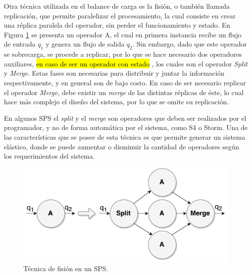 
Otra técnica utilizada en el balance de carga es la fisión, o también llamada replicación, que permite paralelizar el procesamiento, la cual consiste en crear una réplica paralela del operador, sin perder el funcionamiento y estado. En Figura \ref{fig:fision} se presenta un operador A, el cual en primera instancia recibe un flujo de entrada $q_1$ y genera un flujo de salida $q_2$. Sin embargo, dado que este operador se sobrecarga, se procede a replicar, por lo que se hace necesario dos operadores auxiliares, \hl{en caso de ser un operador con estado} \citep{WuKWO12}, los cuales son el operador \textit{Split} y \textit{Merge}. Estas fases son necesarias para distribuir y juntar la información respectivamente, y en general son de bajo costo. En caso de ser necesario replicar el operador \textit{Merge}, debe existir un \textit{merge} de las distintas réplicas de éste, lo cual hace más complejo el diseño del sistema, por lo que se omite su replicación.

En algunos SPS el \textit{split} y el \textit{merge} son operadores que deben ser realizados por el programador, y no de forma automática por el sistema, como S4 o Storm. Una de las características que se posee de esta técnica es que permite generar un sistema elástico, donde se puede aumentar o disminuir la cantidad de operadores según los requerimientos del sistema.

\begin{figure}[!ht]
	\centering
	\includegraphics[scale=0.4]{images/Fision.pdf}
	\caption{Técnica de fisión en un SPS.}
	\label{fig:fision}
\end{figure}

